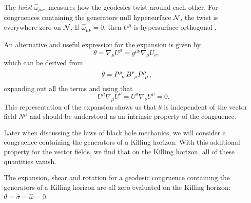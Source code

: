The \emph{twist} $\hat{\omega}_{\mu \nu}$, measures how the geodesics twist around each other. For congruences containing the generators null hypersurface ${\cal N}$, the twist is everywhere zero on ${\cal N}$. If $\hat{\omega}_{\mu \nu} = 0$, then $U^\mu$ is hypersurface orthogonal \cite{Wald:106274}. 

An alternative and useful expression for the expansion is given by
\begin{equation}
\label{eq:genexpansion}
	\theta = \nabla_\mu U^\mu = g^{\mu \nu} \nabla_\mu U_\nu,
\end{equation}
which can be derived from
\begin{equation*}
	\theta = \tensor{P}{^\mu_\nu} \tensor{B}{^\nu_\rho} \tensor{P}{^\rho_\mu},
\end{equation*}
expanding out all the terms and using that
\begin{equation*}
	 \qquad U^\mu \nabla_\mu U^\nu =  U^\mu \nabla_\nu U^\mu = 0.
\end{equation*}
This representation of the expansion shows us that $\theta$ is independent of the vector field $N^\mu$ and should be understood as an intrinsic property of the congruence. 

Later when discussing the laws of black hole mechanics, we will consider a congruence containing the generators of a Killing horizon. With this additional property for the vector fields, we find that on the Killing horizon, all of these quantities vanish.

\begin{prop}
The expansion, shear and rotation for a geodesic congruence containing the generators of a Killing horizon are all zero evaluated on the Killing horizon: $\theta = \hat{\sigma} = \hat{\omega} = 0$.
\end{prop}

